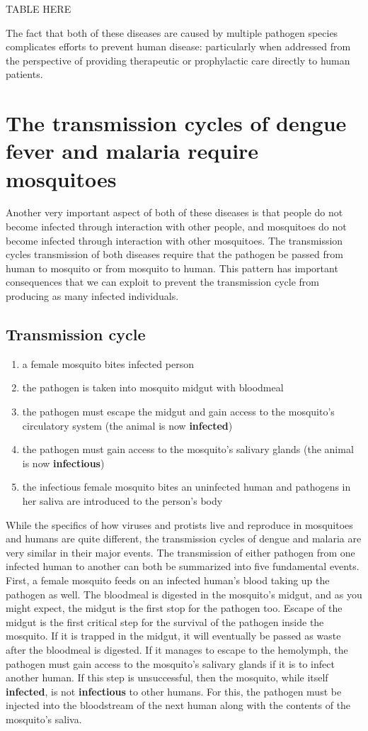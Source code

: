 \alert{TABLE HERE}

The fact that both of these diseases are caused by multiple pathogen species complicates efforts to prevent human disease: particularly when addressed from the perspective of providing therapeutic or prophylactic care directly to human patients.

\section{The transmission cycles of dengue fever and malaria require mosquitoes}

Another very important aspect of both of these diseases is that people do not become infected through interaction with other people, and mosquitoes do not become infected through interaction with other mosquitoes.
The transmission cycles transmission of both diseases require that the pathogen be passed from human to mosquito or from mosquito to human.
This pattern has important consequences that we can exploit to prevent the transmission cycle from producing as many infected individuals.

\subsection{Transmission cycle}

\begin{enumerate}
\item a female mosquito bites infected person
\item the pathogen is taken into mosquito midgut with bloodmeal
\item the pathogen must escape the midgut and gain access to the mosquito's circulatory system (the animal is now \textbf{infected})
\item the pathogen must gain access to the mosquito's salivary glands (the animal is now \textbf{infectious})
\item the infectious female mosquito bites an uninfected human and pathogens in her saliva are introduced to the person's body
\end{enumerate}
While the specifics of how viruses and protists live and reproduce in mosquitoes and humans are quite different, the transmission cycles of dengue and malaria are very similar in their major events.
The transmission of either pathogen from one infected human to another can both be summarized into five fundamental events.
First, a female mosquito feeds on an infected human's blood taking up the pathogen as well.
The bloodmeal is digested in the mosquito's midgut, \alert{and as you might expect, the midgut is the first stop for the pathogen too.}
Escape of the midgut is the first critical step for the survival of the pathogen inside the mosquito.
If it is trapped in the midgut, it will eventually be passed as waste after the bloodmeal is digested.
If it manages to escape to the \gls{hemolymph}, the pathogen must gain access to the mosquito's salivary glands if it is to infect another human.
If this step is unsuccessful, then the mosquito, while itself \textbf{infected}, is not \textbf{infectious} to other humans.
For this, the pathogen must be injected into the bloodstream of the next human along with the contents of the mosquito's saliva.

